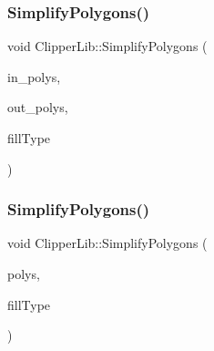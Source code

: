 \mbox{\label{namespace_clipper_lib_ac9ebbe437e4c08816bffeced6d001cf6}} 
\subsubsection{\texorpdfstring{SimplifyPolygons()}{SimplifyPolygons()}\hspace{0.1cm}{\footnotesize\ttfamily [1/2]}}
{\footnotesize\ttfamily void Clipper\+Lib\+::\+Simplify\+Polygons (\begin{DoxyParamCaption}\item[{const \mbox{\hyperlink{namespace_clipper_lib_a4bab1d9e10805fa6f1fd3b78c56efcfe}{Paths}} \&}]{in\+\_\+polys,  }\item[{\mbox{\hyperlink{namespace_clipper_lib_a4bab1d9e10805fa6f1fd3b78c56efcfe}{Paths}} \&}]{out\+\_\+polys,  }\item[{\mbox{\hyperlink{namespace_clipper_lib_a95a41ff8fa6b351d304829c267d638d7}{Poly\+Fill\+Type}}}]{fill\+Type }\end{DoxyParamCaption})}

\mbox{\label{namespace_clipper_lib_ac43b677f95d30bd595bbdd5eb79cdcec}} 
\subsubsection{\texorpdfstring{SimplifyPolygons()}{SimplifyPolygons()}\hspace{0.1cm}{\footnotesize\ttfamily [2/2]}}
{\footnotesize\ttfamily void Clipper\+Lib\+::\+Simplify\+Polygons (\begin{DoxyParamCaption}\item[{\mbox{\hyperlink{namespace_clipper_lib_a4bab1d9e10805fa6f1fd3b78c56efcfe}{Paths}} \&}]{polys,  }\item[{\mbox{\hyperlink{namespace_clipper_lib_a95a41ff8fa6b351d304829c267d638d7}{Poly\+Fill\+Type}}}]{fill\+Type }\end{DoxyParamCaption})}

\mbox{\label{namespace_clipper_lib_a052da0ab7e1690b61e36e007769df9f8}} 
